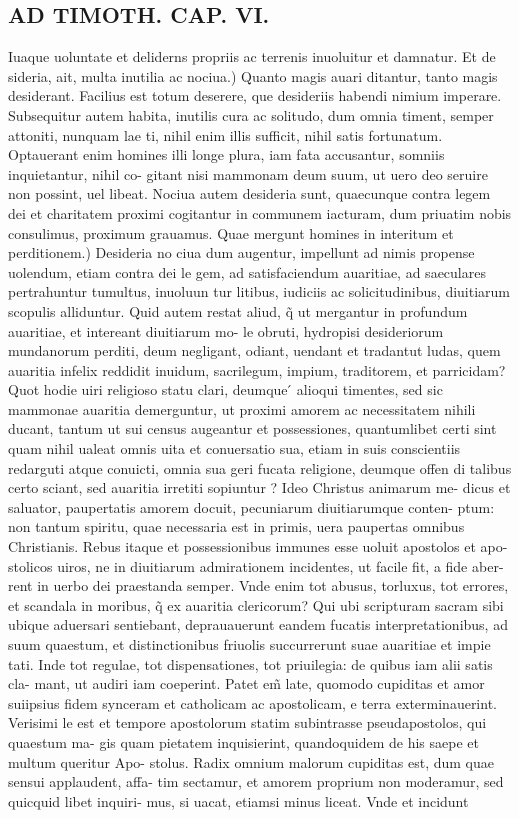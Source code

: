 \documentclass{article}
\begin{document}
\begin{pages}
\section*{AD TIMOTH. CAP. VI. }
\marginpar{[ p.535 ]}\pstart Iuaque uoluntate et deliderns propriis ac terrenis inuoluitur et damnatur. Et de sideria, ait, multa inutilia ac nociua.) Quanto magis auari ditantur, tanto magis desiderant. Facilius est totum deserere, que desideriis habendi nimium imperare. Subsequitur autem habita, inutilis cura ac solitudo, dum omnia timent, semper attoniti, nunquam lae ti, nihil enim illis sufficit, nihil satis fortunatum. Optauerant enim homines illi longe plura, iam fata accusantur, somniis inquietantur, nihil co- gitant nisi mammonam deum suum, ut uero deo seruire non possint, uel libeat. Nociua autem desideria sunt, quaecunque contra legem dei et charitatem proximi cogitantur in communem iacturam, dum priuatim nobis consulimus, proximum grauamus. Quae mergunt homines in interitum et perditionem.) Desideria no ciua dum augentur, impellunt ad nimis propense uolendum, etiam contra dei le gem, ad satisfaciendum auaritiae, ad saeculares pertrahuntur tumultus, inuoluun tur litibus, iudiciis ac solicitudinibus, diuitiarum scopulis alliduntur. Quid autem restat aliud, q̃ ut mergantur in profundum auaritiae, et intereant diuitiarum mo- le obruti, hydropisi desideriorum mundanorum perditi, deum negligant, odiant, uendant et tradantut ludas, quem auaritia infelix reddidit inuidum, sacrilegum, impium, traditorem, et parricidam? Quot hodie uiri religioso statu clari, deumque ́ alioqui timentes, sed sic mammonae auaritia demerguntur, ut proximi amorem ac necessitatem nihili ducant, tantum ut sui census augeantur et possessiones, quantumlibet certi sint quam nihil ualeat omnis uita et conuersatio sua, etiam in suis conscientiis redarguti atque conuicti, omnia sua geri fucata religione, deumque offen di talibus certo sciant, sed auaritia irretiti sopiuntur ? Ideo Christus animarum me- dicus et saluator, paupertatis amorem docuit, pecuniarum diuitiarumque conten- ptum: non tantum spiritu, quae necessaria est in primis, uera paupertas omnibus Christianis. Rebus itaque et possessionibus immunes esse uoluit apostolos et apo- stolicos uiros, ne in diuitiarum admirationem incidentes, ut facile fit, a fide aber- rent in uerbo dei praestanda semper. Vnde enim tot abusus, torluxus, tot errores, et scandala in moribus, q̃ ex auaritia clericorum? Qui ubi scripturam sacram sibi ubique aduersari sentiebant, deprauauerunt eandem fucatis interpretationibus, ad suum quaestum, et distinctionibus friuolis succurrerunt suae auaritiae et impie tati. Inde tot regulae, tot dispensationes, tot priuilegia: de quibus iam alii satis cla- mant, ut audiri iam coeperint. Patet em̃ late, quomodo cupiditas et amor suiipsius fidem synceram et catholicam ac apostolicam, e terra exterminauerint. Verisimi le est et tempore apostolorum statim subintrasse pseudapostolos, qui quaestum ma- gis quam pietatem inquisierint, quandoquidem de his saepe et multum queritur Apo- stolus. Radix omnium malorum cupiditas est, dum quae sensui applaudent, affa- tim sectamur, et amorem proprium non moderamur, sed quicquid libet inquiri- mus, si uacat, etiamsi minus liceat. Vnde et incidunt 
\end{pages}
\end{document}
